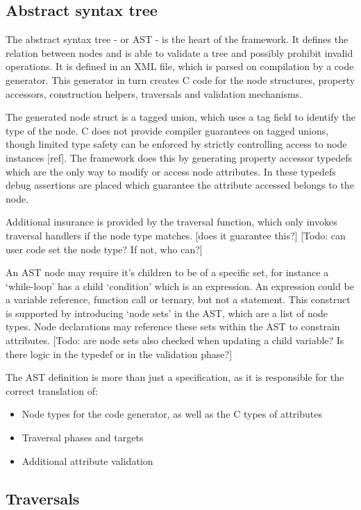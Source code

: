 \documentclass[final,a4paper,12pt]{article}
\begin{document}
\subsection{Abstract syntax tree}
The abstract syntax tree - or AST - is the heart of the framework. It defines the relation between nodes and is able to validate a tree and possibly prohibit invalid operations. It is defined in an XML file, which is parsed on compilation by a code generator. This generator in turn creates C code for the node structures, property accessors, construction helpers, traversals and validation mechanisms.

The generated node struct is a tagged union, which uses a tag field to identify the type of the node. C does not provide compiler guarantees on tagged unions, though limited type safety can be enforced by strictly controlling access to node instances [ref]. The  framework does this by generating property accessor typedefs which are the only way to modify or access node attributes. In these typedefs debug assertions are placed which guarantee the attribute accessed belongs to the node.

Additional insurance is provided by the traversal function, which only invokes traversal handlers if the node type matches. [does it guarantee this?] [Todo: can user code set the node type? If not, who can?]

An AST node may require it's children to be of a specific set, for instance a `while-loop' has a child `condition' which is an expression. An expression could be a variable reference, function call or ternary, but not a statement. This construct is supported by introducing `node sets' in the AST, which are a list of node types. Node declarations may reference these sets within the AST to constrain attributes. [Todo: are node sets also checked when updating a child variable? Is there logic in the typedef or in the validation phase?]

The AST definition is more than just a specification, as it is responsible for the correct translation of:
\begin{itemize}
	\item Node types for the code generator, as well as the C types of attributes
	\item Traversal phases and targets
	\item Additional attribute validation
\end{itemize}

\subsection{Traversals}
\end{document}
